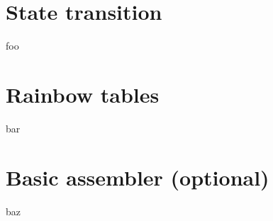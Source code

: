 




\newcommand{\nr}{1}
\setcounter{section}{1}



\section{State transition}
foo
\section{Rainbow tables}
bar
\section{Basic assembler (optional)}
baz


